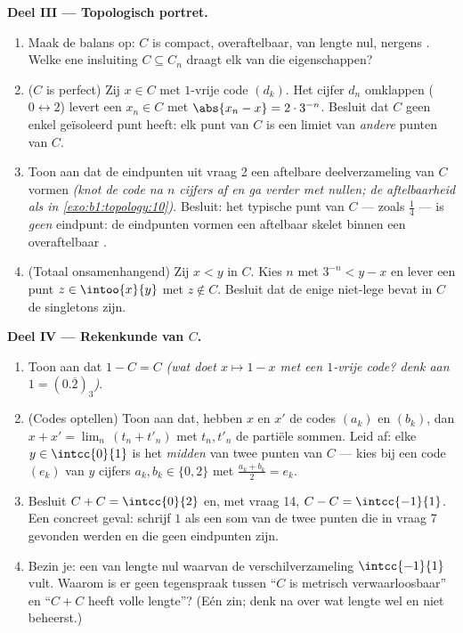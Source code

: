 \begin{problem}[{Weekendopgave --- de \omterm{pb:b1:topology:1}{Cantorverzameling} van de middelste
derden: lengte nul, overaftelbaar, perfect, en $C + C = \intcc{0}{2}$}]
\medskip
\noindent\textbf{Deel III --- Topologisch portret.}
\begin{enumerate}[resume]
  \item Maak de balans op: $C$ is compact, overaftelbaar, van lengte
        nul, nergens . Welke ene insluiting $C \subseteq C_n$
        draagt elk van die eigenschappen?
  \item ($C$ is perfect) Zij $x \in C$ met $1$-vrije code $(d_k)$. Het
        cijfer $d_n$ omklappen ($0 \leftrightarrow 2$) levert een $x_n
        \in C$ met $\abs{x_n - x} = 2 \cdot 3^{-n}$. Besluit dat $C$
        geen enkel geïsoleerd punt heeft: elk punt van $C$ is een limiet
        van \emph{andere} punten van $C$.
  \item Toon aan dat de eindpunten uit vraag 2 een aftelbare 
        deelverzameling van $C$ vormen \emph{(knot de code na $n$
        cijfers af en ga verder met nullen; de aftelbaarheid als in
        \cref{exo:b1:topology:10})}. Besluit: het typische punt van $C$
        --- zoals $\frac14$ --- is \emph{geen} eindpunt: de eindpunten
        vormen een aftelbaar skelet binnen een overaftelbaar .
  \item (Totaal onsamenhangend) Zij $x < y$ in $C$. Kies $n$ met $3^{-n}
        < y - x$ en lever een punt $z \in \intoo{x}{y}$ met $z \notin
        C$. Besluit dat de enige niet-lege  bevat in $C$ de
        singletons zijn.
\end{enumerate}

\medskip
\noindent\textbf{Deel IV --- Rekenkunde van $C$.}
\begin{enumerate}[resume]
  \item Toon aan dat $1 - C = C$ \emph{(wat doet $x \mapsto 1 - x$ met
        een $1$-vrije code? denk aan $1 = (0.\overline{2})_3$)}.
  \item (Codes optellen) Toon aan dat, hebben $x$ en $x'$ de codes
        $(a_k)$ en $(b_k)$, dan $x + x' = \lim_n\,(t_n + t'_n)$ met
        $t_n, t'_n$ de partiële sommen. Leid af: elke $y \in
        \intcc{0}{1}$ is het \emph{midden} van twee punten van $C$ ---
        kies bij een code $(e_k)$ van $y$ cijfers $a_k, b_k \in \{0,
        2\}$ met $\frac{a_k + b_k}{2} = e_k$.
  \item Besluit $C + C = \intcc{0}{2}$ en, met vraag 14, $C - C =
        \intcc{-1}{1}$. Een concreet geval: schrijf $1$ als een som van
        de twee punten die in vraag 7 gevonden werden en die geen
        eindpunten zijn.
  \item Bezin je: een  van lengte nul waarvan de
        verschilverzameling $\intcc{-1}{1}$ vult. Waarom is er geen
        tegenspraak tussen ``$C$ is metrisch verwaarloosbaar'' en ``$C +
        C$ heeft volle lengte''? (Eén zin; denk na over wat lengte wel
        en niet beheerst.)
\end{enumerate}


\end{problem}
